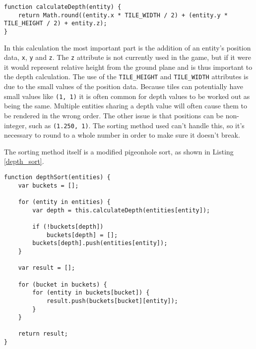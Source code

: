 \noindent
\begin{minipage}{\linewidth}
\begin{lstlisting}[style=js, caption={Calculation to work out an entity's relative depth in the scene.}, label=calculate_depth]
function calculateDepth(entity) {
    return Math.round((entity.x * TILE_WIDTH / 2) + (entity.y * TILE_HEIGHT / 2) + entity.z);
}
\end{lstlisting}
\end{minipage}

In this calculation the most important part is the addition of an entity's position data, \texttt{x}, \texttt{y} and \texttt{z}. The \texttt{z} attribute is not currently used in the game, but if it were it would represent relative height from the ground plane and is thus important to the depth calculation. The use of the \texttt{TILE\_HEIGHT} and \texttt{TILE\_WIDTH} attributes is due to the small values of the position data. Because tiles can potentially have small values like \texttt{(1, 1)} it is often common for depth values to be worked out as being the same. Multiple entities sharing a depth value will often cause them to be rendered in the wrong order. The other issue is that positions can be non-integer, such as \texttt{(1.250, 1)}. The sorting method used can't handle this, so it's necessary to round to a whole number in order to make sure it doesn't break.

The sorting method itself is a modified pigeonhole sort, as shown in Listing \ref{depth_sort}.

\noindent
\begin{minipage}{\linewidth}
\begin{lstlisting}[style=js, caption={Depth sorting entities in a scene using a modified pigeonhole sort.}, label=depth_sort]
function depthSort(entities) {
    var buckets = [];

    for (entity in entities) {
        var depth = this.calculateDepth(entities[entity]);

        if (!buckets[depth])
            buckets[depth] = [];
        buckets[depth].push(entities[entity]);
    }

    var result = [];

    for (bucket in buckets) {
        for (entity in buckets[bucket]) {
            result.push(buckets[bucket][entity]);
        }
    }

    return result;
}
\end{lstlisting}
\end{minipage}

